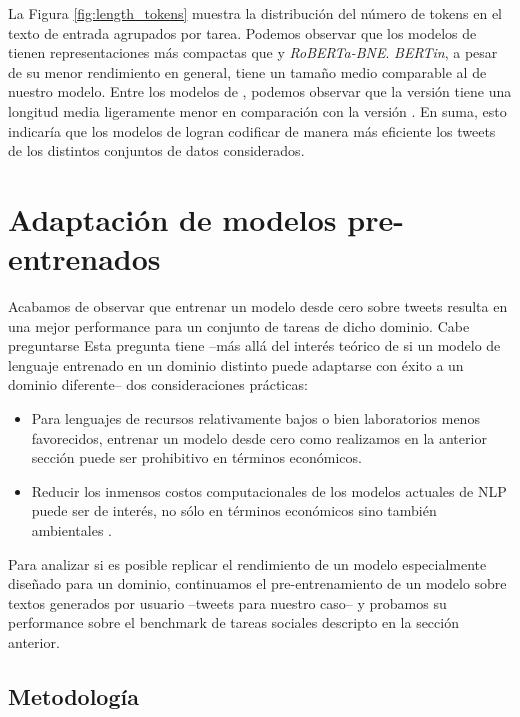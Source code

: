 La Figura \ref{fig:length_tokens} muestra la distribución del número de tokens en el texto de entrada agrupados por tarea. Podemos observar que los modelos de \robertuito{} tienen representaciones más compactas que \beto{} y \emph {RoBERTa-BNE}. \emph{BERTin}, a pesar de su menor rendimiento en general, tiene un tamaño medio comparable al de nuestro modelo. Entre los modelos de \robertuito{}, podemos observar que la versión \deacc{} tiene una longitud media ligeramente menor en comparación con la versión \uncased{}. En suma, esto indicaría que los modelos de \robertuito{} logran codificar de manera más eficiente los tweets de los distintos conjuntos de datos considerados.


\section{Adaptación de modelos pre-entrenados}
\label{sec:domain_adaptation_vs_robertuito}

Acabamos de observar que entrenar un modelo desde cero sobre tweets resulta en una mejor performance para un conjunto de tareas de dicho dominio. Cabe preguntarse  Esta pregunta tiene --más allá del interés teórico de si un modelo de lenguaje entrenado en un dominio distinto puede adaptarse con éxito a un dominio diferente-- dos consideraciones prácticas:

\begin{itemize}
    \item Para lenguajes de recursos relativamente bajos o bien laboratorios menos favorecidos, entrenar un modelo desde cero como realizamos en la anterior sección puede ser prohibitivo en términos económicos.
    \item Reducir los inmensos costos computacionales de los modelos actuales de NLP puede ser de interés, no sólo en términos económicos sino también ambientales \cite{bender2021dangers}.
\end{itemize}

Para analizar si es posible replicar el rendimiento de un modelo especialmente diseñado para un dominio, continuamos el pre-entrenamiento de un modelo \beto{} sobre textos generados por usuario --tweets para nuestro caso-- y probamos su performance sobre el benchmark de tareas sociales descripto en la sección anterior.


\subsection{Metodología}


